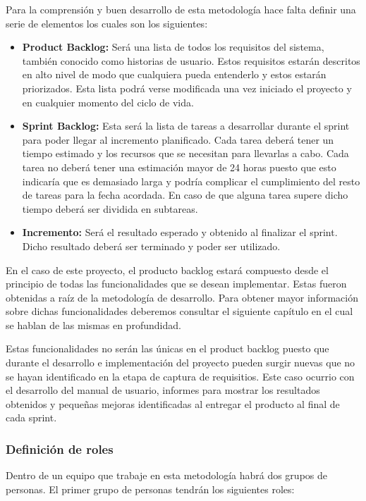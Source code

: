 Para la comprensión y buen desarrollo de esta metodología hace falta definir una serie
 de elementos los cuales son los siguientes:

\begin{itemize}
  \item \textbf{Product Backlog:} Será una lista de todos los requisitos del sistema, también
     conocido como historias de usuario. Estos requisitos estarán descritos en alto nivel
     de modo que cualquiera pueda entenderlo y estos estarán priorizados. Esta lista
     podrá verse modificada una vez iniciado el proyecto y en cualquier momento del ciclo de vida.
  \item \textbf{Sprint Backlog:} Esta será la lista de tareas a desarrollar durante el sprint
     para poder llegar al incremento planificado. Cada tarea deberá tener un tiempo estimado
     y los recursos que se necesitan para llevarlas a cabo. Cada tarea no deberá tener una
     estimación mayor de 24 horas puesto que esto indicaría que es demasiado larga y podría
     complicar el cumplimiento del resto de tareas para la fecha acordada. En caso de que
     alguna tarea supere dicho tiempo deberá ser dividida en subtareas.
  \item \textbf{Incremento:} Será el resultado esperado y obtenido al finalizar el sprint. Dicho
     resultado deberá ser terminado y poder ser utilizado.
\end{itemize}

En el caso de este proyecto, el producto backlog estará compuesto desde el principio de todas
 las funcionalidades que se desean implementar. Estas fueron obtenidas a raíz de la metodología
 de desarrollo. Para obtener mayor información sobre dichas funcionalidades deberemos consultar
 el siguiente capítulo en el cual se hablan de las mismas en profundidad.

Estas funcionalidades no serán las únicas en el product backlog puesto que durante el desarrollo
 e implementación del proyecto pueden surgir nuevas que no se hayan identificado en la etapa
 de captura de requisitios. Este caso ocurrio con el desarrollo del manual de usuario,
 informes para mostrar los resultados obtenidos y pequeñas mejoras identificadas al entregar
 el producto al final de cada sprint.

\subsubsection{Definición de roles}

Dentro de un equipo que trabaje en esta metodología habrá dos grupos de personas. El primer grupo
 de personas tendrán los siguientes roles:

